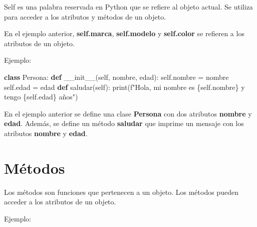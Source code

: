 \documentclass[
  a4paper,
  DIV=11,
  numbers=noendperiod,
  onepage,
  openany]{scrreprt}
\newenvironment{Shaded}{\begin{snugshade}}{\end{snugshade}}
\newcommand{\BuiltInTok}[1]{\textcolor[rgb]{0.00,0.23,0.31}{#1}}
\newcommand{\FunctionTok}[1]{\textcolor[rgb]{0.28,0.35,0.67}{#1}}
\newcommand{\KeywordTok}[1]{\textcolor[rgb]{0.00,0.23,0.31}{\textbf{#1}}}
\newcommand{\NormalTok}[1]{\textcolor[rgb]{0.00,0.23,0.31}{#1}}
\newcommand{\OperatorTok}[1]{\textcolor[rgb]{0.37,0.37,0.37}{#1}}
\newcommand{\SpecialCharTok}[1]{\textcolor[rgb]{0.37,0.37,0.37}{#1}}
\newcommand{\SpecialStringTok}[1]{\textcolor[rgb]{0.13,0.47,0.30}{#1}}
\newcommand{\VariableTok}[1]{\textcolor[rgb]{0.07,0.07,0.07}{#1}}
\begin{document}
Self es una palabra reservada en Python que se refiere al objeto actual.
Se utiliza para acceder a los atributos y métodos de un objeto.

En el ejemplo anterior, \textbf{self.marca}, \textbf{self.modelo} y
\textbf{self.color} se refieren a los atributos de un objeto.

Ejemplo:

\begin{Shaded}
\begin{Highlighting}[]
\KeywordTok{class}\NormalTok{ Persona:}
    \KeywordTok{def} \FunctionTok{\_\_init\_\_}\NormalTok{(}\VariableTok{self}\NormalTok{, nombre, edad):}
        \VariableTok{self}\NormalTok{.nombre }\OperatorTok{=}\NormalTok{ nombre}
        \VariableTok{self}\NormalTok{.edad }\OperatorTok{=}\NormalTok{ edad}
    \KeywordTok{def}\NormalTok{ saludar(}\VariableTok{self}\NormalTok{):}
        \BuiltInTok{print}\NormalTok{(}\SpecialStringTok{f"Hola, mi nombre es }\SpecialCharTok{\{}\VariableTok{self}\SpecialCharTok{.}\NormalTok{nombre}\SpecialCharTok{\}}\SpecialStringTok{ y tengo }\SpecialCharTok{\{}\VariableTok{self}\SpecialCharTok{.}\NormalTok{edad}\SpecialCharTok{\}}\SpecialStringTok{ años"}\NormalTok{)}
\end{Highlighting}
\end{Shaded}

En el ejemplo anterior se define una clase \textbf{Persona} con dos
atributos \textbf{nombre} y \textbf{edad}. Además, se define un método
\textbf{saludar} que imprime un mensaje con los atributos
\textbf{nombre} y \textbf{edad}.

\section{Métodos}\label{muxe9todos}

Los métodos son funciones que pertenecen a un objeto. Los métodos pueden
acceder a los atributos de un objeto.

Ejemplo:
\end{document}
